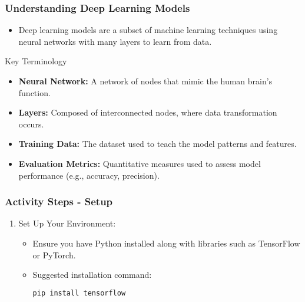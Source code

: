 \documentclass[aspectratio=169]{beamer}
\begin{document}
\begin{frame}[fragile]
    \frametitle{Understanding Deep Learning Models}
    \begin{itemize}
        \item Deep learning models are a subset of machine learning techniques using neural networks with many layers to learn from data.
    \end{itemize}
    \begin{block}{Key Terminology}
        \begin{itemize}
            \item \textbf{Neural Network:} A network of nodes that mimic the human brain's function.
            \item \textbf{Layers:} Composed of interconnected nodes, where data transformation occurs.
            \item \textbf{Training Data:} The dataset used to teach the model patterns and features.
            \item \textbf{Evaluation Metrics:} Quantitative measures used to assess model performance (e.g., accuracy, precision).
        \end{itemize}
    \end{block}
\end{frame}

\begin{frame}[fragile]
    \frametitle{Activity Steps - Setup}
    \begin{enumerate}
        \item Set Up Your Environment:
        \begin{itemize}
            \item Ensure you have Python installed along with libraries such as TensorFlow or PyTorch.
            \item Suggested installation command:
            \begin{lstlisting}[language=bash]
pip install tensorflow
            \end{lstlisting}
        \end{itemize}
    \end{enumerate}
\end{frame}
\end{document}
